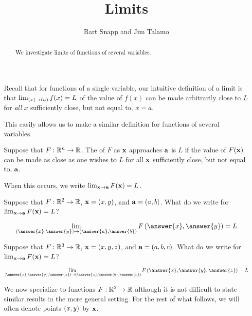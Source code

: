 \documentclass{ximera}
\author{Bart Snapp and Jim Talamo}
\title[Dig-In:]{Limits}
\begin{document}
\begin{abstract}
We investigate limits of functions of several variables.
\end{abstract}
\maketitle

Recall that for functions of a single variable, our intuitive definition of a limit is that $\lim_{\left(x\right) \to \left(a\right)} f(x) = L$ of the value of $f(x)$ can be made arbitrarily close to $L$ for \emph{all} $x$ sufficiently close, but not equal to, $x=a$.

This easily allows us to make a similar definition for functions of several variables.

\begin{definition}
 Suppose that $F:\mathbb R^n\to\mathbb R$.  The  of $F$ as $\mathbf{x}$ approaches $\mathbf{a}$ is $L$ if the value of $F(\mathbf{x})$ can be made as close as one wishes to $L$ for all $\mathbf{x}$ sufficiently close, but not equal to, $\mathbf{a}$.
 
 When this occurs, we write $\lim_{\mathbf{x}\to \mathbf{a}} F(\mathbf{x}) = L$.  
\end{definition}

\begin{question}
  Suppose that $F:\mathbb R^2\to\mathbb R$, $\mathbf{x} = \left(x,y\right)$, and $\mathbf{a} =
  \left(a,b\right)$. What do we write for $\lim_{\mathbf{x}\to \mathbf{a}}
  F(\mathbf{x}) = L$?
  \begin{prompt}
    \[
    \lim_{\point{\answer{x},\answer{y}}\to \point{\answer{a},\answer{b}}} F\left(\answer{x},\answer{y}\right) = L
    \]
  \end{prompt}
  \begin{question}
    Suppose that $F:\mathbb R^3\to\mathbb R$, $\mathbf{x} = \left(x,y,z\right)$, and
    $\mathbf{a} = \left(a,b,c\right)$. What do we write for $\lim_{\mathbf{x}\to
      \mathbf{a}} F(\mathbf{x}) = L$?
    \begin{prompt}
      \[
      \lim_{\point{\answer{x},\answer{y},\answer{z}}\to \point{\answer{a},\answer{b},\answer{c}}} F\left(\answer{x},\answer{y},\answer{z}\right) = L
      \]
    \end{prompt}
  \end{question}
\end{question}

We now specialize to functions $F:\mathbb R^2 \to \mathbb R$ although it is not difficult to state similar results in the more general setting.  For the rest of what follows, we will often denote points $\left(x,y\right)$ by $\mathbf{x}$.
\end{document}
